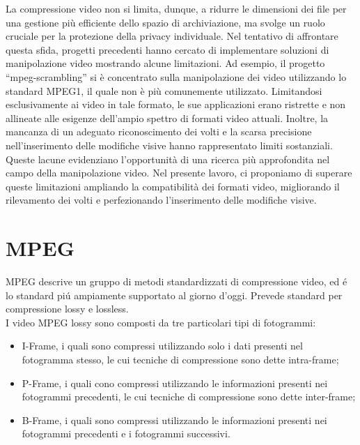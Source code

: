 \documentclass{report}
\begin{document}
La compressione video non si limita, dunque, a ridurre le dimensioni dei file per una gestione più efficiente dello spazio di archiviazione, ma svolge un ruolo cruciale per la protezione della privacy individuale. Nel tentativo di affrontare questa sfida, progetti precedenti hanno cercato di implementare soluzioni di manipolazione video mostrando alcune limitazioni. Ad esempio, il progetto “mpeg-scrambling” si è concentrato sulla manipolazione dei video utilizzando lo standard MPEG1, il quale non è più comunemente utilizzato. Limitandosi esclusivamente ai video in tale formato, le sue applicazioni erano ristrette e non allineate alle esigenze dell’ampio spettro di formati video attuali. Inoltre, la mancanza di un adeguato riconoscimento dei volti e la scarsa precisione nell’inserimento delle modifiche visive hanno rappresentato limiti sostanziali. Queste lacune evidenziano l’opportunità di una ricerca più approfondita nel campo della manipolazione video. Nel presente lavoro, ci proponiamo di superare queste limitazioni ampliando la compatibilità dei formati video, migliorando il rilevamento dei volti e perfezionando l’inserimento delle modifiche visive.

\section{MPEG}
MPEG descrive un gruppo di metodi standardizzati di compressione video, ed é lo standard piú ampiamente supportato al giorno d'oggi. Prevede standard per compressione lossy e lossless. \\
I video MPEG lossy sono composti da tre particolari tipi di fotogrammi:

\begin{itemize}
        \item{I-Frame, i quali sono compressi utilizzando solo i dati presenti nel fotogramma stesso, le cui tecniche di compressione sono dette intra-frame;}
        \item{P-Frame, i quali cono compressi utilizzando le informazioni presenti nei fotogrammi precedenti, le cui tecniche di compressione sono dette inter-frame;}
        \item{B-Frame, i quali sono compressi utilizzando le informazioni presenti nei fotogrammi precedenti e i fotogrammi successivi.}
\end{itemize}
\end{document}
